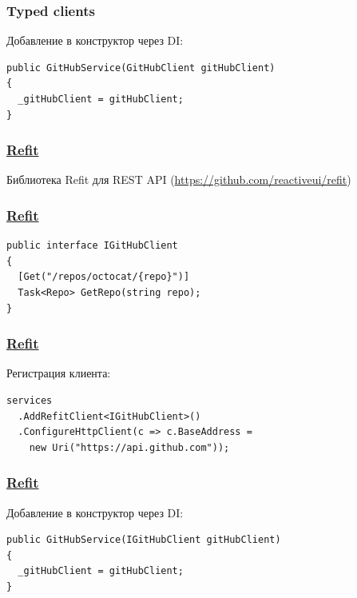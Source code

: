 \documentclass[17pt,aspectratio=169]{beamer}
\begin{document}
\begin{frame}[fragile]
\frametitle{Typed clients}
Добавление в конструктор через DI:
\newline
\begin{lstlisting}
public GitHubService(GitHubClient gitHubClient)
{
  _gitHubClient = gitHubClient;
}
\end{lstlisting}
\end{frame}

\begin{frame}[fragile]
\frametitle{\href{https://github.com/reactiveui/refit}{Refit}}
Библиотека Refit для REST API (\href{https://github.com/reactiveui/refit}{https://github.com/reactiveui/refit})
\end{frame}

\begin{frame}[fragile]
\frametitle{\href{https://github.com/reactiveui/refit}{Refit}}
\begin{lstlisting}
public interface IGitHubClient
{
  [Get("/repos/octocat/{repo}")]
  Task<Repo> GetRepo(string repo);
}
\end{lstlisting}
\end{frame}

\begin{frame}[fragile]
\frametitle{\href{https://github.com/reactiveui/refit}{Refit}}
Регистрация клиента:
\newline
\begin{lstlisting}
services
  .AddRefitClient<IGitHubClient>()
  .ConfigureHttpClient(c => c.BaseAddress = 
    new Uri("https://api.github.com"));
\end{lstlisting}
\end{frame}

\begin{frame}[fragile]
\frametitle{\href{https://github.com/reactiveui/refit}{Refit}}
Добавление в конструктор через DI:
\newline
\begin{lstlisting}
public GitHubService(IGitHubClient gitHubClient)
{
  _gitHubClient = gitHubClient;
}
\end{lstlisting}
\end{frame}
\end{document}
